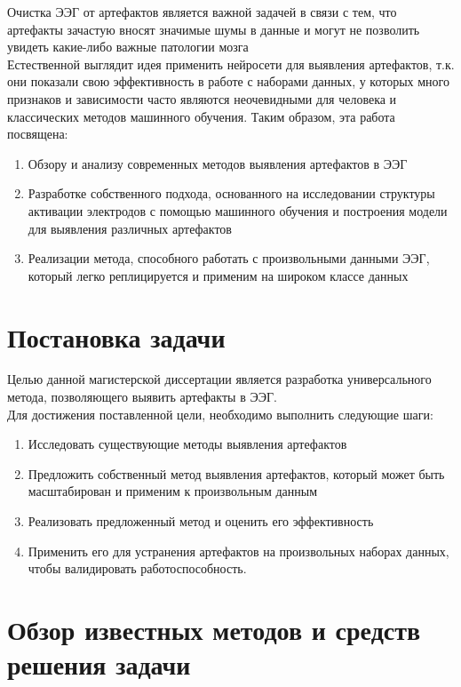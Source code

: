 \documentclass[12pt, a4paper, titlepage]{extreport}
\begin{document}
 	Очистка ЭЭГ от артефактов является важной задачей в связи с тем, что артефакты зачастую вносят значимые шумы в данные и могут не позволить увидеть какие-либо важные патологии мозга\\
 	Естественной выглядит идея применить нейросети для выявления артефактов, т.к. они показали свою эффективность в работе с наборами данных, у которых много признаков и зависимости часто являются неочевидными для человека и классических методов машинного обучения. Таким образом, эта работа посвящена:
 	\begin{enumerate}
 		\item Обзору и анализу современных методов выявления артефактов в ЭЭГ
 		\item Разработке собственного подхода, основанного на исследовании структуры активации электродов с помощью машинного обучения и построения модели для выявления различных артефактов
 		\item Реализации метода, способного работать с произвольными данными ЭЭГ, который легко реплицируется и применим на широком классе данных
 	\end{enumerate}
 	
	\chapter*{Постановка задачи}
	Целью данной магистерской диссертации является разработка универсального метода, позволяющего выявить артефакты в ЭЭГ.\\
	Для достижения поставленной цели, необходимо выполнить следующие шаги:
	\begin{enumerate}
		\item Исследовать существующие методы выявления артефактов
		\item Предложить собственный метод выявления артефактов, который может быть масштабирован и применим к произвольным данным
		\item Реализовать предложенный метод и оценить его эффективность
		\item Применить его для устранения артефактов на произвольных наборах данных, чтобы валидировать работоспособность.
	\end{enumerate}
	\chapter*{Обзор известных методов и средств решения задачи}
\end{document}
